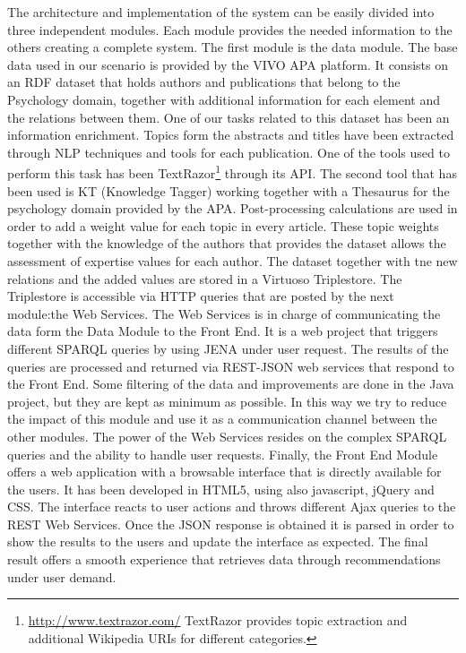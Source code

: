The architecture and implementation of the system can be easily divided into three independent modules. Each module provides the needed information to the others creating a complete system.
The first module is the data module. The base data used in our scenario is provided by the VIVO APA platform. It consists on an RDF dataset that holds authors and publications that belong to the Psychology domain, together with additional information for each element and the relations between them. One of our tasks related to this dataset has been an information enrichment. Topics form the abstracts and titles have been extracted through NLP techniques and tools for each publication. One of the tools used to perform this task has been TextRazor\footnote{\url{http://www.textrazor.com/} TextRazor provides topic extraction and additional Wikipedia URIs for different categories.} through its API. The second tool that has been used is KT (Knowledge Tagger) working together with a Thesaurus for the psychology domain provided by the APA. Post-processing calculations are used in order to add a weight value for each topic in every article. These topic weights together with the knowledge of the authors that provides the dataset allows the assessment of expertise values for each author. The dataset together with tne new relations and the added values are stored in a Virtuoso Triplestore. The Triplestore is accessible via HTTP queries that are posted by the next module:the Web Services.
The Web Services is in charge of communicating the data form the Data Module to the Front End. It is a web project that triggers different SPARQL queries by using JENA under user request. The results of the queries are processed and returned via REST-JSON web services that respond to the Front End. Some filtering of the data and improvements are done in the Java project, but they are kept as minimum as possible. In this way we try to reduce the impact of this module and use it as a communication channel between the other modules. The power of the Web Services resides on the complex SPARQL queries and the ability to handle user requests.
Finally, the Front End Module offers a web application with a browsable interface that is directly available for the users. It has been developed in HTML5, using also javascript, jQuery and CSS. The interface reacts to user actions and throws different Ajax queries to the REST Web Services. Once the JSON response is obtained it is parsed in order to show the results to the users and update the interface as expected. The final result offers a smooth experience that retrieves data through recommendations under user demand. 

